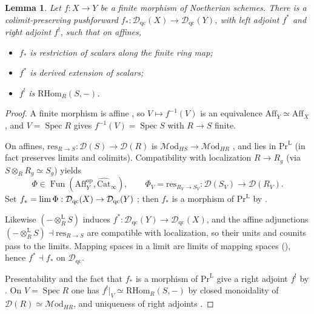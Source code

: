 \documentclass[11pt]{amsart}
\newcommand{\cD}{\mathcal{D}}
\newcommand{\cMod}{\mathcal{M}\mathrm{od}}
\newcommand{\op}{{\operatorname{op}}}
\renewcommand{\lim}{\operatornamewithlimits{\rm{lim}}}
\newcommand{\Spec}{\operatorname{Spec}}
\renewcommand{\Pr}{\mathrm{Pr}}
\newcommand{\Aff}{\mathrm{Aff}}
\DeclareMathOperator{\Fun}{\mathrm{Fun}}
\newcommand{\Catbig}{\widehat{\mathrm{Cat}}}
\newcommand{\Dqc}{\mathcal D_{\mathrm{qc}}}
\theoremstyle{plain}
\newtheorem{lemma}[lemma]{Lemma}
\theoremstyle{definition}
\numberwithin{equation}{section}
\begin{document}
\begin{lemma}\label{lem:finite-push}
Let $f:X\to Y$ be a finite morphism of Noetherian schemes.
There is a colimit-preserving pushforward $f_*:\Dqc(X)\to\Dqc(Y)$, with left adjoint $f^*$ and right adjoint $f^!$, such that on affines,
\begin{itemize}
\item
$f_*$ is restriction of scalars along the finite ring map;
\item
$f^*$ is derived extension of scalars;
\item
$f^!$ is $\mathrm{RHom}_R(S,-)$.
\end{itemize}
\end{lemma}
\begin{proof}
A finite morphism is affine \cite[\href{https://stacks.math.columbia.edu/tag/01WN}{Tag 01WN}]{SP}, so $V\mapsto f^{-1}(V)$ is an equivalence $\Aff_Y\simeq\Aff_X$, and $V=\Spec R$ gives $f^{-1}(V)=\Spec S$ with $R\to S$ finite.

On affines, $\mathrm{res}_{R\to S}:\cD(S)\to\cD(R)$ is $\cMod_{HS}\to\cMod_{HR}$ \cite[Theorem 7.1.2.13]{HA}, and lies in $\Pr^{\mathrm L}$ (in fact preserves limits and colimits).
Compatibility with localization $R\to R_g$ (via $S\otimes_R R_g\simeq S_g$) yields
\[
 \Phi\in\Fun(\Aff_Y^{\op},\Catbig_\infty),\qquad
 \Phi_V=\mathrm{res}_{R_V\to S_V}:\cD(S_V)\to\cD(R_V).
\]
Set $f_*=\lim\Phi:\Dqc(X)\to\Dqc(Y)$ \cite[Corollary 4.2.4.8; Remark 3.0.0.5]{HTT}; then $f_*$ is a morphism of $\Pr^{\mathrm L}$ by \cite[Proposition 5.5.3.13]{HTT}.

Likewise $(-\otimes_R^{\mathrm L}S)$ induces $f^*:\Dqc(Y)\to\Dqc(X)$, and the affine adjunctions $(-\otimes_R^{\mathrm L}S)\dashv\mathrm{res}_{R\to S}$ are compatible with localization, so their units and counits pass to the limits.
Mapping spaces in a limit are limits of mapping spaces (), hence $f^*\dashv f_*$ on $\Dqc$.

Presentability and the fact that $f_*$ is a morphism of $\Pr^{\mathrm L}$ give a right adjoint $f^!$ by \cite[Corollary 5.5.2.9]{HTT}.
On $V=\Spec R$ one has $f^!|_V\simeq\mathrm{RHom}_R(S,-)$ by closed monoidality of $\cD(R)\simeq\cMod_{HR}$, and uniqueness of right adjoints \cite[Remark 5.2.2.2]{HTT}.
\end{proof}
\end{document}
